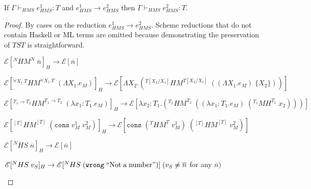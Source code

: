 \begin{theorem}
\label{pn}
\onehalfspacing
If $\Gamma\vdash_{HMS}e_{HMS}^{1}:T$ and $e_{HMS}^{1}\rightarrow e_{HMS}^{2}$ then $\Gamma\vdash_{HMS}e_{HMS}^{2}:T$.
\begin{proof}
By cases on the reduction $e_{HMS}^{1}\rightarrow e_{HMS}^{2}$.  Scheme reductions that do not contain Haskell or ML terms are omitted because demonstrating the preservation of $TST$ is straightforward.











%

\begin{case}
$\mathscr{E}[^{N}HM^{N}\;\overline{n}]_{H}\rightarrow\mathscr{E}[\overline{n}]$

\end{case}
\begin{case}
$\mathscr{E}[^{\forall X_{1}.T}HM^{\forall X_{1}.T}\;(\Lambda X_{1}.e_{M})]_{H}\rightarrow\mathscr{E}[\Lambda X_{2}.(^{T[X_{2}/X_{1}]}HM^{T[X_{2}/X_{1}]}\;((\Lambda X_{1}.e_{M})\;\lbrace X_{2}\rbrace))]$


\end{case}
\begin{case}
$\mathscr{E}[^{T_{1}\rightarrow T_{2}}HM^{T_{1}\rightarrow T_{2}}\;(\lambda x_{1}:T_{1}.e_{M})]_{H}\rightarrow\mathscr{E}[\lambda x_{2}:T_{1}.(^{T_{2}}HM^{T_{2}}\;((\lambda x_{1}:T_{1}.e_{M})\;(^{T_{1}}MH^{T_{1}}\;x_{2})))]$

\end{case}
\begin{case}
$\mathscr{E}[^{[T]}HM^{[T]}\;(\mathtt{cons}\;v_{M}^{1}\;v_{M}^{2})]_{H}\rightarrow\mathscr{E}[\mathtt{cons}\;(^{T}HM^{T}\;v_{M}^{1})\;(^{[T]}HM^{[T]}\;v_{M}^{2})]$

\end{case}
\begin{case}
$\mathscr{E}[^{N}HS\;\overline{n}]_{H}\rightarrow\mathscr{E}[\overline{n}]$

\end{case}
\begin{case}
$\mathscr{E}[^{N}HS\;v_{S}]_{H}\rightarrow\mathscr{E}[^{N}HS\;(\mathtt{wrong}\;\mathrm{``Not\;a\;number"})]\;(v_{S}\neq\overline{n}$ for any $\overline{n})$


\end{case}
\end{proof}
\end{theorem}
